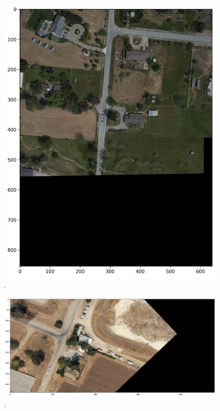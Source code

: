 \documentclass[10pt,twocolumn,letterpaper]{article}
\begin{document}
\begin{figure}
\begin{center}
	\includegraphics[width=0.99\textwidth]{pics/vertical_panorama_img_3}
	\caption{. \label{fig:pan-img-3}}   
\end{center} 
\end{figure}

\begin{figure}
\begin{center}
	\includegraphics[width=0.99\textwidth]{pics/horizontal_panorama_img_4}
	\caption{. \label{fig:pan-img-4}}   
\end{center} 
\end{figure}
\end{document}
